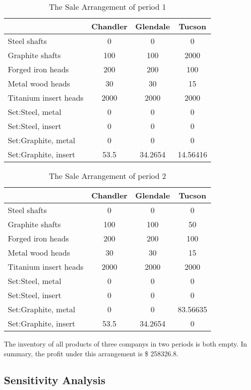 \documentclass[12pt]{article}
\begin{document}
\begin{table}[H]
	\centering
	\setlength{\belowcaptionskip}{0.1cm}
	\caption{The Sale Arrangement of period 1}
	\label{tab15}
	\begin{tabular}{lccc}
		\hline
		\hline
		&Chandler&Glendale&	Tucson\\
		\hline
		Steel shafts& 0&0&0\\
		Graphite shafts& 100&100&2000\\
		Forged iron heads&200&200&100\\
		Metal wood heads&30&30&15\\
		Titanium insert heads&2000&2000&2000\\
		Set:Steel, metal&0&0&0\\
		Set:Steel, insert&0&0&0\\
		Set:Graphite, metal&0&0&0\\
		Set:Graphite, insert&53.5&34.2654&14.56416\\
		\hline
		\hline
	\end{tabular}
\end{table}

\begin{table}[H]
	\centering
	\setlength{\belowcaptionskip}{0.1cm}
	\caption{The Sale Arrangement of period 2}
	\label{tab16}
	\begin{tabular}{lccc}
		\hline
		\hline
		&Chandler&Glendale&	Tucson\\
		\hline
		Steel shafts& 0&0&0\\
		Graphite shafts& 100&100&50\\
		Forged iron heads&200&200&100\\
		Metal wood heads&30&30&15\\
		Titanium insert heads&2000&2000&2000\\
		Set:Steel, metal&0&0&0\\
		Set:Steel, insert&0&0&0\\
		Set:Graphite, metal&0&0&83.56635\\
		Set:Graphite, insert&53.5&34.2654&0\\
		\hline
		\hline
	\end{tabular}
\end{table}

\noindent The inventory of all products of three companys in two periods is both empty. In summary, the profit under this arrangement is  \$ 258326.8.

\subsection{Sensitivity Analysis}
\end{document}
